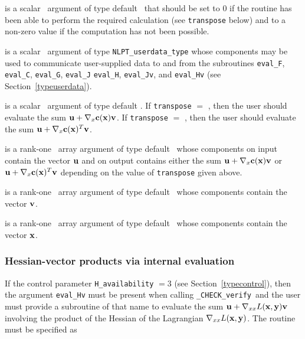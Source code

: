 \documentclass{galahad}
\newcommand{\packagename}{CHECK}
\newcommand{\fullpackagename}{\libraryname\_\packagename}
\newcommand{\solver}{{\tt \fullpackagename\_verify}}
\begin{document}
\begin{description}

 is a scalar \intentout\ argument of type default \integer\
that should be set to 0 if the routine has been able to perform the
required calculation (see {\tt transpose} below) and to a non-zero
value if the computation has not been possible.

 is a scalar \intentinout\ argument of type 
{\tt NLPT\_userdata\_type} whose components may be used
to communicate user-supplied data to and from the
subroutines {\tt eval\_F}, {\tt eval\_C}, {\tt eval\_G}, {\tt eval\_J}
{\tt eval\_H}, {\tt eval\_Jv}, and {\tt eval\_Hv} 
(see Section~\ref{typeuserdata}).

 is a scalar \intentin\ argument of type default
\logical.  If {\tt transpose} $=$ \false, then the user should evaluate the
sum ${\mathbf{u}} + \nabla_x {\mathbf{c}}({\mathbf{x}}) {\mathbf{v}}$. If {\tt transpose} $=$ \true,
then the user should evaluate the sum ${\mathbf{u}} + \nabla_x {\mathbf{c}}({\mathbf{x}})^T {\mathbf{v}}$.   

 is a rank-one \intentinout\ array argument of type default \realdp\
whose components on input contain the vector ${\mathbf{u}}$ and on output contains
either the sum ${\mathbf{u}} + \nabla_x {\mathbf{c}}({\mathbf{x}}) {\mathbf{v}}$ or ${\mathbf{u}} + \nabla_x {\mathbf{c}}({\mathbf{x}})^T
{\mathbf{v}}$ depending on the value of {\tt transpose} given above.

 is a rank-one \intentin\ array argument of type default \realdp\
whose components contain the vector ${\mathbf{v}}$.

\ittf{X} is a rank-one \intentin\ array argument of type default \realdp\
whose components contain the vector ${\mathbf{x}}$.

\end{description}


\subsubsection{Hessian-vector products via internal evaluation\label{hvfv}}

If the control parameter {\tt H\_availability} $=3$ (see
Section~\ref{typecontrol}), then the argument {\tt eval\_Hv} must be
present when calling \solver\ and the
user must provide a subroutine of that name to evaluate the
sum ${\mathbf{u}} + \nabla_{xx} L({\mathbf{x}},{\mathbf{y}}) {\mathbf{v}}$ involving the
product of the Hessian of the Lagrangian $\nabla_{xx} L({\mathbf{x}},{\mathbf{y}})$.
The routine must be specified as
\end{document}
